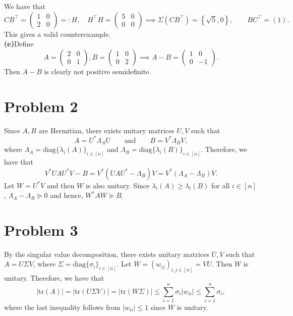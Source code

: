 \documentclass[11pt]{article}
\theoremstyle{plain}
\theoremstyle{definition}
\theoremstyle{remark}
\newcommand{\tr}{\mathrm{tr}}
\newcommand{\diag}{\mathrm{diag}}
\newcommand{\abs}[1]{\left\vert#1\right\vert}
\begin{document}
We have that
$$
    CB^\top = \begin{pmatrix}
    1 & 0
    \\2 & 0
    \end{pmatrix} =: H,\quad H^\top H = \begin{pmatrix}
    5 & 0
    \\0 & 0
    \end{pmatrix}
    \implies \Sigma(CB^\top) = \left\{\sqrt 5, 0\right\},
    \qquad 
    BC^\top = (1) .
$$
This gives a valid counterexample.
\\\textbf{(e)}Define
$$
    A = \begin{pmatrix}
        2 & 0
        \\0 & 1
    \end{pmatrix},
    B =\begin{pmatrix}
        1 & 0
        \\0 & 2
    \end{pmatrix}
    \implies A - B = \begin{pmatrix}
        1 & 0
        \\0 & -1
    \end{pmatrix} .
$$
Then $A-B$ is clearly not positive semidefinite.
\section*{Problem 2}
Since $A,B$ are Hermitian, there exists unitary matrices $U,V$ such that 
$$
    A = U^* \Lambda_A U\qquad\text{and}\qquad B = V^*\Lambda_B V,
$$
where $\Lambda_A = \diag\{\lambda_i(A)\}_{i\in[n]}$ and $\Lambda_B = \diag\{\lambda_i(B)\}_{i\in[n]}$.
Therefore, we have that
$$
    V^*UAU^*V - B = V^*(UAU^*-\Lambda_B)V = V^*(\Lambda_A-\Lambda_B)V.
$$
Let $W = U^*V$ and then $W$ is also unitary.
Since $\lambda_i(A)\geq \lambda_i(B)$ for all $i\in[n]$, $\Lambda_A-\Lambda_B\succeq 0$ and hence, $ W^*AW \succeq B$.
\section*{Problem 3}
By the singular value decomposition, there exists unitary matrices $U,V$ such that $A= U\Sigma V$, where $\Sigma = \diag\{\sigma_i\}_{i\in[n]}$.
Let $W = (w_{ij})_{i,j\in[n]} = VU$.
Then $W$ is unitary.
Therefore, we have that
$$
    \abs{\tr(A)} = \abs{\tr(U\Sigma V)} = \abs{\tr(W\Sigma)}
    \leq \sum_{i=1}^n \sigma_i\abs{w_{ii}} \leq \sum_{i=1}^n \sigma_i,
$$
where the last inequality follows from $\abs{w_{ii}}\leq 1$ since $W$ is unitary.
\end{document}
